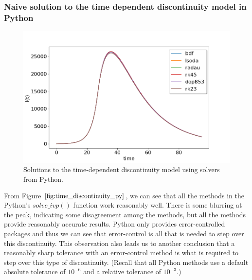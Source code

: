 \subsubsection{Naive solution to the time dependent discontinuity model in Python}
\begin{figure}[H]
\centering
\includegraphics[width=0.7\linewidth]{./figures/time_discontinuity_py}
\caption{Solutions to the time-dependent discontinuity model using solvers from Python.}
\label{fig:time_discontinuity_py}
\end{figure}
From Figure $\ref{fig:time_discontinuity_py}$, we can see that all the methods in the Python's $solve\_ivp()$ function work reasonably well. There is some blurring at the peak, indicating some disagreement among the methods, but all the methods provide reasonably accurate results. Python only provides error-controlled packages and thus we can see that error-control is all that is needed to step over this discontinuity. This observation also leads us to another conclusion that a reasonably sharp tolerance with an error-control method is what is required to step over this type of discontinuity. (Recall that all Python methods use a default absolute tolerance of $10^{-6}$ and a relative tolerance of $10^{-3}$.)

